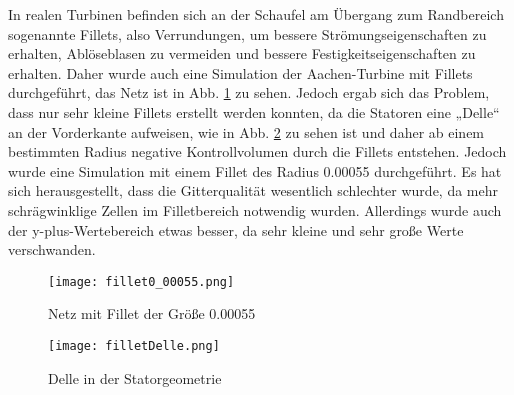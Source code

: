 In realen Turbinen befinden sich an der Schaufel am Übergang zum Randbereich sogenannte Fillets, also Verrundungen, um bessere Strömungseigenschaften zu erhalten, Ablöseblasen zu vermeiden und bessere Festigkeitseigenschaften zu erhalten. Daher wurde auch eine Simulation der Aachen-Turbine mit Fillets durchgeführt, das Netz ist in Abb. \ref{imgFillet1} zu sehen. Jedoch ergab sich das Problem, dass nur sehr kleine Fillets erstellt werden konnten, da die Statoren eine „Delle“ an der Vorderkante aufweisen, wie in Abb. \ref{imgFilletDelle} zu sehen ist und daher ab einem bestimmten Radius negative Kontrollvolumen durch die Fillets entstehen. Jedoch wurde eine Simulation mit einem Fillet des Radius 0.00055 durchgeführt. Es hat sich herausgestellt, dass die Gitterqualität wesentlich schlechter wurde, da mehr schrägwinklige Zellen im Filletbereich notwendig wurden. Allerdings wurde auch der y-plus-Wertebereich etwas besser, da sehr kleine und sehr große Werte verschwanden.     

  \begin{figure}[htbp]
	\centering
	\label{imgFillet1}
	\texttt{[image: fillet0\_00055.png]}
	\caption{Netz mit Fillet der Größe 0.00055}
\end{figure} 

  \begin{figure}[htbp]
	\centering
	\label{imgFilletDelle}
	\texttt{[image: filletDelle.png]}
	\caption{Delle in der Statorgeometrie}
\end{figure} 
